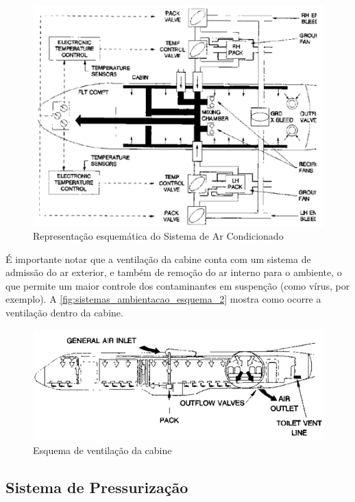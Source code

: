 \begin{figure}
\centering
\includegraphics[width=\textwidth]{images/parte3/sistemas_ambientacao_esquema.png}
\caption{Representação esquemática do Sistema de Ar Condicionado}
\label{fig:sistemas_ambientacao_esquema}
\end{figure}

É importante notar que a ventilação da cabine conta com um sistema de admissão do ar exterior, e também de remoção do ar interno para o ambiente, o que permite um maior controle dos contaminantes em suspenção (como vírus, por exemplo).
A \autoref{fig:sistemas_ambientacao_esquema_2} mostra como ocorre a ventilação dentro da cabine.

\begin{figure}
\centering
\includegraphics[width=\textwidth]{images/parte3/sistemas_ambientacao_esquema_2.png}
\caption{Esquema de ventilação da cabine}
\label{fig:sistemas_ambientacao_esquema_2}
\end{figure}

\subsection{Sistema de Pressurização}


